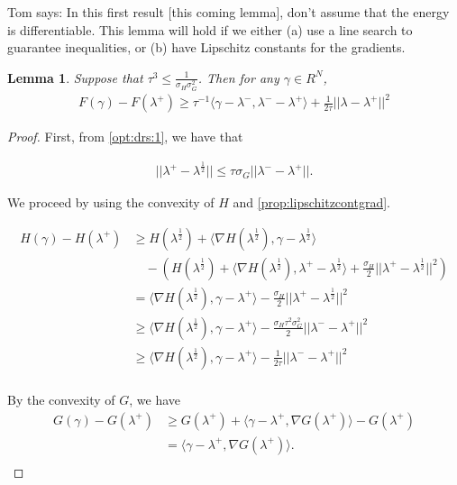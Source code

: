 \documentclass[11pt]{article}
\newcommand{\inv}{^{-1}}
\newcommand{\half}{^{\frac 12}}
\newcommand{\plus}{^+}
\newcommand{\minus}{^-}
\newcommand{\inner}[2]{\langle #1, #2\rangle}
\def\grad {{\nabla}}
\newtheorem{lemma}{Lemma}
\begin{document}
\noindent Tom says: In this first result [this coming lemma], don't assume that
the energy is differentiable.  This lemma will hold if we either (a)
use a line search to guarantee inequalities, or (b) have Lipschitz
constants for the gradients.

\begin{lemma}
\label{lem:1}
Suppose that $\tau^3 \le \frac 1{\sigma_H\sigma_G^2}$.  Then for any $\gamma \in R^N$,
\begin{align*}
F(\gamma) - F(\lambda\plus) \ge \tau\inv\inner{\gamma - \lambda\minus}{\lambda\minus - \lambda^+} + \frac 1{2\tau}||\lambda-\lambda^+||^2
\end{align*}
\end{lemma}

\begin{proof}
First, from \cref{opt:drs:1}, we have that 

\begin{align}
||\lambda^+ - \lambda\half|| \le \tau \sigma_G ||\lambda\minus - \lambda^+||.
\end{align}

\noindent We proceed by using the convexity of $H$ and \cref{prop:lipschitzcontgrad}.

\begin{align*}
H(\gamma) - H(\lambda\plus) &\ge H(\lambda\half) + \inner{\grad H(\lambda\half)}{\gamma - \lambda\half} \\
&\quad - \left(H(\lambda\half) + \inner{\grad H(\lambda\half)}{\lambda\plus - \lambda\half} + \frac{\sigma_H}{2}||\lambda\plus - \lambda\half||^2\right) \\
&= \inner{\grad H(\lambda\half)}{\gamma - \lambda\plus} - \frac{\sigma_H}{2}||\lambda\plus - \lambda\half||^2 \\
&\ge \inner{\grad H(\lambda\half)}{\gamma - \lambda\plus} - \frac{\sigma_H\tau^2\sigma_G^2}{2}||\lambda\minus - \lambda\plus||^2 \\
&\ge \inner{\grad H(\lambda\half)}{\gamma - \lambda\plus} - \frac{1}{2\tau}||\lambda\minus - \lambda\plus||^2 \\
\end{align*}

By the convexity of $G$, we have
\begin{align*}
G(\gamma) - G(\lambda^+) &\ge G(\lambda^+) + \inner{\gamma - \lambda^+}{\grad G(\lambda^+)} - G(\lambda^+) \\
&= \inner{\gamma - \lambda^+}{\grad G(\lambda^+)}. \\
\end{align*}


\end{proof}
\end{document}
